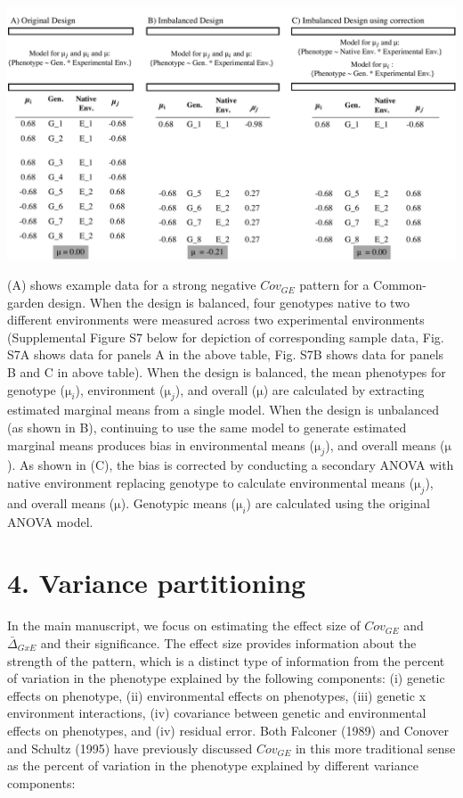 \documentclass[11pt, oneside]{amsart}
\begin{document}
\renewcommand\thefigure{T1}
\begin{table}[h]
\begin{center}
\includegraphics[width=6in]{Figs/UnbalancedTable.pdf}
\end{center}
\label{Table: Unbalanced Designs before and after correction}
\caption[Overall, genotypic, and environmental mean phenotypes]{(A) shows example data for a strong negative $Cov_{GE}$ pattern for a Common-garden design. When the design is balanced, four genotypes native to two different environments were measured across two experimental environments (Supplemental Figure S7 below for depiction of corresponding sample data, Fig. S7A shows data for panels A in the above table, Fig. S7B shows data for panels B and C in above table). When the design is balanced, the mean phenotypes for genotype ($\si\micro_{i}$), environment ($\si\micro_{j}$), and overall ($\si\micro$) are calculated by extracting estimated marginal means from a single model. When the design is unbalanced (as shown in B), continuing to use the same model to generate estimated marginal means produces bias in environmental means ($\si\micro_{j}$), and overall means ($\si\micro$). As shown in (C), the bias is corrected by conducting a secondary ANOVA with native environment replacing genotype to calculate environmental means ($\si\micro_{j}$), and overall means ($\si\micro$). Genotypic means ($\si\micro_{i}$) are calculated using the original ANOVA model.}
\end{table}
 
\clearpage
\newpage
\section{4. Variance partitioning}

In the main manuscript, we focus on estimating the effect size of $Cov_{GE}$ and $\bar\Delta_{GxE}$ and their significance. The effect size provides information about the strength of the pattern, which is a distinct type of information from the percent of variation in the phenotype explained by the following components: (i) genetic effects on phenotype, (ii) environmental effects on phenotypes, (iii) genetic x environment interactions, (iv) covariance between genetic and environmental effects on phenotypes, and (iv) residual error. Both Falconer (1989) and Conover and Schultz (1995) have previously discussed $Cov_{GE}$ in this more traditional sense as the percent of variation in the phenotype explained by different variance components:
\end{document}
